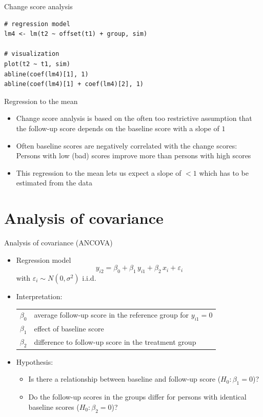 \documentclass[aspectratio=169]{beamer}
\begin{document}
\begin{frame}[fragile]{Change score analysis}
\begin{lstlisting}
# regression model
lm4 <- lm(t2 ~ offset(t1) + group, sim)

# visualization
plot(t2 ~ t1, sim)
abline(coef(lm4)[1], 1)
abline(coef(lm4)[1] + coef(lm4)[2], 1)
\end{lstlisting}
\end{frame}

\begin{frame}{Regression to the mean}
\begin{itemize}
  \item Change score analysis is based on the often too restrictive
    assumption that the follow-up score depends on the baseline score with
    a slope of $1$
  \item Often baseline scores are negatively correlated with the change
    scores:\\
    Persons with low (bad) scores improve more than persons with high scores
  \item This regression to the mean lets us expect a slope of $< 1$ which
    has to be estimated from the data
\end{itemize}
\end{frame}

\section[ANCOVA]{Analysis of covariance}

\begin{frame}{Analysis of covariance (ANCOVA)}
\begin{itemize}
  \item Regression model
    \[
      y_{i2} = \beta_0 + \beta_1 \, y_{i1} + \beta_2 \, x_i + \varepsilon_i
    \]
    with $\varepsilon_i \sim N(0, \sigma^2)$ i.i.d.
  \item Interpretation:
    \begin{tabular}{lp{10cm}}
    $\beta_0$ & average follow-up score in the reference group for $y_{i1} = 0$\\
    $\beta_1$ & effect of baseline score\\
    $\beta_2$ & difference to follow-up score in the treatment group
    \end{tabular}
  \item Hypothesis:
    \begin{itemize}
        \item Is there a relationship between baseline and follow-up score ($H_0\colon \beta_1 = 0$)?
        \item Do the follow-up scores in the groups differ for persons with
          identical baseline scores ($H_0\colon \beta_2 = 0$)?
    \end{itemize}
\end{itemize}
\end{frame}
\end{document}
